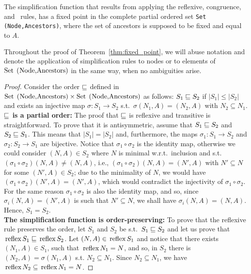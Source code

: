 \begin{theorem}
\label{thm:fixed_point}
	The simplification function that results from applying the reflexive,
	congruence, and \BPA\ rules, has a fixed point in the complete partial
	ordered set \lstinline{Set (Node,Ancestors)}, where the set of ancestors
	is supposed to be fixed and equal to $A$.
\end{theorem}

Throughout the proof of Theorem~\ref{thm:fixed_point}, we will abuse 
notation and denote the application of simplification rules
to nodes or to elements of $\text{\lstinline{Set (Node,Ancestors)}}$
in the same way, when no ambiguities arise.

\begin{proof}
	Consider the order 
	$\sqsubseteq$ defined in $\text{\lstinline{Set (Node,Ancestors)}}
	\times \text{\lstinline{Set (Node,Ancestors)}}$ as follows:
	$S_1 \sqsubseteq S_2$ if $|S_1| \leq |S_2|$ and
	exists an injective map $\sigma : S_1 \rightarrow S_2$ s.t.\  
	$\sigma(N_1,A) = (N_2,A)$ with $N_2\subseteq N_1$.\\
	
	\noindent\textbf{$\sqsubseteq$ is a partial order:} The proof that
	$\sqsubseteq$ is reflexive and transitive is straightforward. 
	To prove that it is 
	antisymmetric, assume that $S_1\sqsubseteq S_2$ and $S_2 \sqsubseteq S_1$.
	This means that $|S_1|=|S_2|$ and, furthermore, the maps 
	$\sigma_1 : S_1 \rightarrow S_2$ and $\sigma_2 : S_2 \rightarrow S_1$
	are bijective. Notice that $\sigma_1\circ \sigma_2$  
	is the identity map, otherwise we could consider $(N,A)\in S_2$
	where $N$ is minimal w.r.t.\ inclusion and s.t.\
	$(\sigma_1\circ \sigma_2)(N,A) \neq (N,A)$, i.e.,
	$(\sigma_1\circ \sigma_2)(N,A) = (N',A)$ with $N'\subseteq N$ 
	for some $(N',A)\in S_2$;
	due to the minimality of $N$, we would have 
	$(\sigma_1\circ \sigma_2)(N',A) = (N',A)$, which would contradict the
	injectivity of $\sigma_1\circ \sigma_2$. For the same reason 
	$\sigma_1\circ \sigma_2$ is also the identity map, and so, since
	$\sigma_i (N,A) = (N',A)$ is such that $N'\subseteq N$, we shall 
	have $\sigma_i (N,A) = (N,A)$. Hence, $S_1=S_2$.\\
	
	\noindent\textbf{The simplification function is order-preserving:}
	To prove that the reflexive rule preserves the order, let $S_1$ and 
	$S_2$ be s.t.\ $S_1\sqsubseteq S_2$ and let us prove that 
	$\text{\lstinline{reflex}} S_1\leqSets\text{\lstinline{reflex}}S_2$.
	Let $(N,A)\in \text{\lstinline{reflex}} S_1$
	and notice that there exists $(N_1,A)\in S_1$, such that
	$\text{\lstinline{reflex}} N_1 = N $, and so,
	in $S_2$ there is $(N_2,A)=\sigma(N_1,A)$ s.t. $N_2\subseteq N_1$. 
	Since $N_2\subseteq N_1$, we have
	$\text{\lstinline{reflex}} N_2 \subseteq
    \text{\lstinline{reflex}} N_1 = N$.
	

\end{proof}
